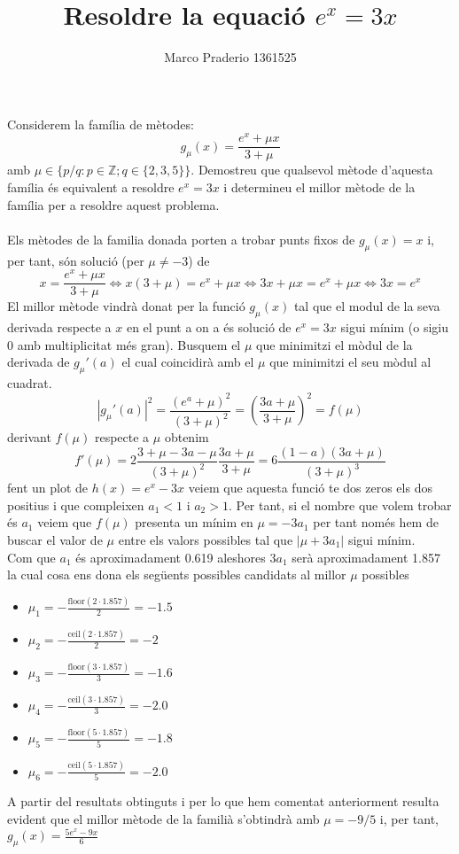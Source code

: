 \documentclass[a4paper,10pt]{article}
\title{Resoldre la equació $e^x=3x$}
\author{Marco Praderio 1361525}
\date{}
\renewcommand{\*}{\cdot}
\renewcommand{\u}{\mu}
\begin{document}
\maketitle
Considerem la família de mètodes:
\begin{equation*}
g_{\u}(x)=\frac{e^x+\u x}{3+\u}
\end{equation*}
amb $\u\in\{p/q : p \in \mathbb{Z}; q \in \{2, 3, 5\}\}$. Demostreu que qualsevol mètode
d’aquesta família  és equivalent a resoldre $e^x=3x$ i determineu el millor mètode de la família per a resoldre aquest problema.\\
\phantom{.}\\
Els mètodes de la familia donada porten a trobar punts fixos de $g_{\u}(x)=x$ i, per tant, són solució (per $\u\not=-3$) de
\begin{equation*}
x=\frac{e^x+\u x}{3+\u}  \Leftrightarrow  x(3+\u)=e^x+\u x  \Leftrightarrow  3x+\u x=e^x+\u x    \Leftrightarrow  3x=e^x
\end{equation*}
El millor mètode vindrà donat per la funció $g_{\u}(x)$ tal que el modul de la seva derivada respecte a $x$ en el punt a on a és solució de $e^x=3x$ sigui mínim (o sigiu 0
amb multiplicitat més gran).
Busquem el $\u$ que minimitzi el mòdul de la derivada de $g_{\u}'(a)$ el cual coincidirà amb el $\u$ que minimitzi el seu mòdul al cuadrat.
\begin{equation*}
|g_{\u}'(a)|^2=\frac{(e^a+\u)^2}{(3+\u)^2}=\left(\frac{3a+\u}{3+\u}\right)^2=f(\u)
\end{equation*}
derivant $f(\u)$ respecte a $\u$ obtenim
\begin{equation*}
f'(\u)=2\frac{3+\u-3a-\u}{(3+\u)^2}\frac{3a+\u}{3+\u}=6\frac{(1-a)(3a+\u)}{(3+\u)^3}
\end{equation*}
fent un plot de $h(x)=e^x-3x$ veiem que aquesta funció te dos zeros els dos positius i que compleixen $a_1<1$ i $a_2>1$.
Per tant, si el nombre que volem trobar és $a_1$ veiem que $f(\u)$ presenta un mínim en $\u=-3a_1$ per tant només hem de buscar el valor de $\u$ entre els valors possibles
tal que $|\u+3a_1|$ sigui mínim.\\
Com que $a_1$ és aproximadament 0.619 aleshores $3a_1$ serà aproximadament 1.857 la cual cosa ens dona els següents possibles candidats al millor $\u$ possibles
\begin{itemize}
\item $\u_1=-\frac{\text{floor}(2\*1.857)}{2}=-1.5$
\item $\u_2=-\frac{\text{ceil}(2\*1.857)}{2}=-2$
\item $\u_3=-\frac{\text{floor}(3\*1.857)}{3}=-1.6$
\item $\u_4=-\frac{\text{ceil}(3\*1.857)}{3}=-2.0$
\item $\u_5=-\frac{\text{floor}(5\*1.857)}{5}=-1.8$
\item $\u_6=-\frac{\text{ceil}(5\*1.857)}{5}=-2.0$
\end{itemize}
A partir del resultats obtinguts i per lo que hem comentat anteriorment resulta evident que el millor mètode de la familià s'obtindrà amb $\u=-9/5$ i, per tant, 
$g_{\u}(x)=\frac{5e^x-9x}{6}$
\end{document}
